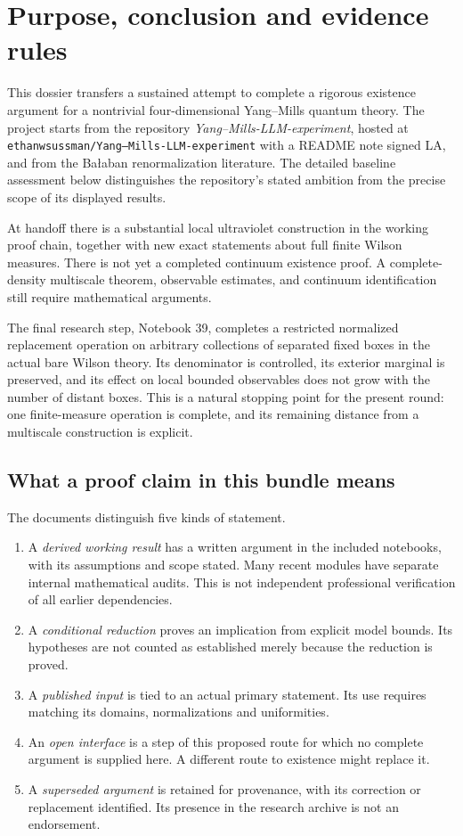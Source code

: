 \section{Purpose, conclusion and evidence rules}
\label{hdc-purpose}

This dossier transfers a sustained attempt to complete a rigorous
existence argument for a nontrivial four-dimensional Yang--Mills
quantum theory. The project starts from the repository
\emph{Yang--Mills-LLM-experiment}, hosted at
\texttt{ethanwsussman/Yang--Mills-LLM-experiment} with a README
note signed LA, and from the Ba{\l}aban renormalization literature. The detailed
baseline assessment below distinguishes the repository's stated
ambition from the precise scope of its displayed results.

At handoff there is a substantial local ultraviolet construction
in the working proof chain, together with new exact statements
about full finite Wilson measures. There is not yet a completed
continuum existence proof. A complete-density multiscale theorem,
observable estimates, and continuum identification still require
mathematical arguments.

The final research step, Notebook 39, completes a restricted
normalized replacement operation on arbitrary collections of
separated fixed boxes in the actual bare Wilson theory. Its
denominator is controlled, its exterior marginal is preserved,
and its effect on local bounded observables does not grow with
the number of distant boxes. This is a natural stopping point
for the present round: one finite-measure operation is complete,
and its remaining distance from a multiscale construction is explicit.

\subsection{What a proof claim in this bundle means}

The documents distinguish five kinds of statement.
\begin{enumerate}
\item A \emph{derived working result} has a written argument in the
included notebooks, with its assumptions and scope stated. Many
recent modules have separate internal mathematical audits.
This is not independent professional verification of all earlier
dependencies.
\item A \emph{conditional reduction} proves an implication from
explicit model bounds. Its hypotheses are not counted as established
merely because the reduction is proved.
\item A \emph{published input} is tied to an actual primary statement.
Its use requires matching its domains, normalizations and uniformities.
\item An \emph{open interface} is a step of this proposed route
for which no complete argument is supplied here. A different
route to existence might replace it.
\item A \emph{superseded argument} is retained for provenance, with
its correction or replacement identified. Its presence in the
research archive is not an endorsement.
\end{enumerate}

